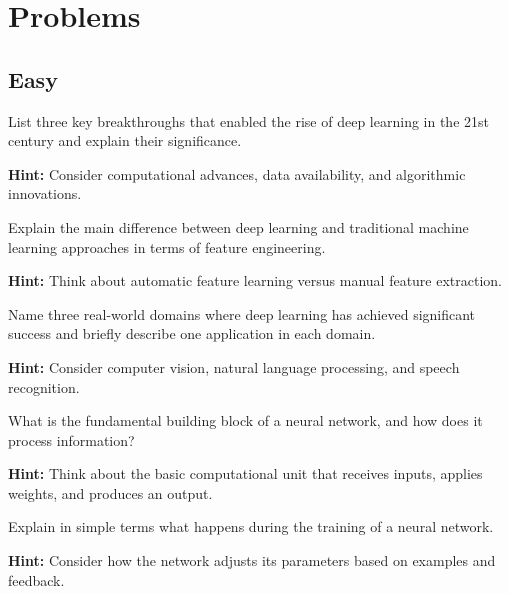 
\section*{Problems}

\subsection*{Easy}

\begin{problem}
List three key breakthroughs that enabled the rise of deep learning in the 21st century and explain their significance.

\textbf{Hint:} Consider computational advances, data availability, and algorithmic innovations.
\end{problem}

\begin{problem}
Explain the main difference between deep learning and traditional machine learning approaches in terms of feature engineering.

\textbf{Hint:} Think about automatic feature learning versus manual feature extraction.
\end{problem}

\begin{problem}
Name three real-world domains where deep learning has achieved significant success and briefly describe one application in each domain.

\textbf{Hint:} Consider computer vision, natural language processing, and speech recognition.
\end{problem}

\begin{problem}
What is the fundamental building block of a neural network, and how does it process information?

\textbf{Hint:} Think about the basic computational unit that receives inputs, applies weights, and produces an output.
\end{problem}

\begin{problem}
Explain in simple terms what happens during the training of a neural network.

\textbf{Hint:} Consider how the network adjusts its parameters based on examples and feedback.
\end{problem}

